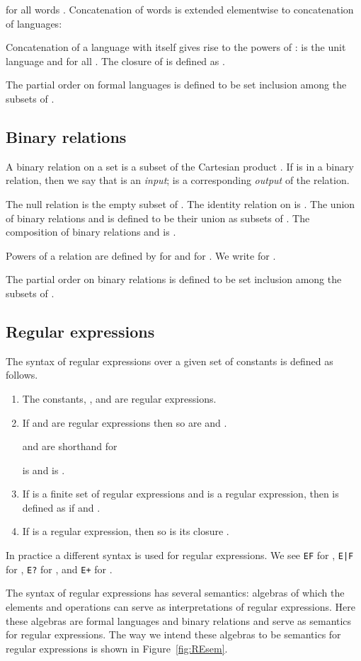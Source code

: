 \documentclass[preprint,11pt]{elsarticle}
\begin{document}
for all words .
Concatenation of words is extended elementwise to
concatenation of languages:

Concatenation of a language  with itself
gives rise to the powers of :
 is the unit language
and  for all .
The closure  of  is defined as
.

The partial order  on formal languages is defined
to be set inclusion among the subsets of .

\subsection{Binary relations}
A binary relation on a set  is a subset of
the Cartesian product .
If  is in a binary relation,
then we say that  is an \emph{input};
 is a corresponding \emph{output} of the relation.

The null relation is the empty subset of .
The identity relation  on 
is . 
The union  of binary relations
 and   is defined to be
their union as subsets of .
The composition  of binary relations
 and 
is . 

Powers of a relation  are defined by
 for 
and  for .
We write  for .

The partial order  on binary relations is defined
to be set inclusion among the subsets of .

\subsection{Regular expressions}

The syntax of regular expressions \cite{prr90}
over a given set of constants is
defined as follows.
\begin{enumerate}
\item
The constants, , and  are regular expressions.
\item
If  and  are regular expressions
then so are  and
.

 and  are shorthand for

 is  and  is .
\item
If  is a finite set of regular expressions
and  is a regular expression,
then  is defined as
 if 
and
.
\item
If  is a regular expression,
then so is its closure .
\end{enumerate}

In practice a different syntax is used for regular expressions.
We see {\tt EF} for ,
{\tt E|F} for ,
{\tt E?} for ,
and
{\tt E+} for .

The syntax of regular expressions has several semantics:
algebras of which the elements and operations
can serve as interpretations of regular expressions.
Here these algebras are formal languages and binary relations
and serve as semantics for regular expressions. 
The way we intend these algebras to be semantics for regular
expressions is shown in Figure~\ref{fig:REsem}.
\end{document}
